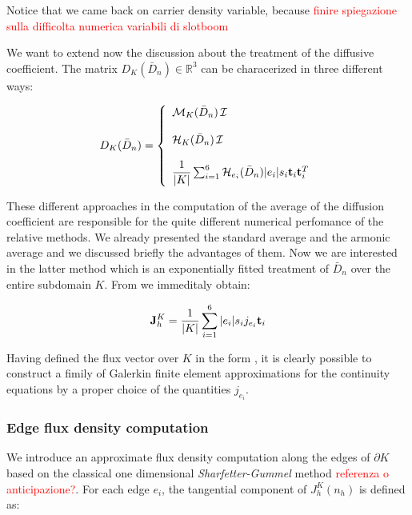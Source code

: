 Notice that we came back on carrier density variable, because 
\textcolor{red}{finire spiegazione sulla difficolta numerica variabili di slotboom}

We want to extend now the discussion about the treatment of the diffusive coefficient. The matrix $D_K(\bar{D}_n) \in \mathbb{R}^3$ can be characerized in three different ways:

\begin{equation}
D_K(\bar{D}_n) = \left\{ 
\begin{array}{l}
\mathcal{M}_K(\bar{D}_n) \, \mathcal{I}
\\
\\
\mathcal{H}_K(\bar{D}_n) \, \mathcal{I}
\\
\\
 \dfrac{1}{|K|}\sum_{i=1}^6 \mathcal{H}_{e_i}(\bar{D}_n) |e_i| s_i \mathbf{t}_i \mathbf{t}_i^T
\end{array}
\right.
\end{equation} 

These different approaches in the computation of the average of the diffusion coefficient are responsible for the quite different numerical perfomance of the relative methods.
We already presented the standard average and the armonic average and we discussed briefly the advantages of them. 
Now we are interested in the latter method which  is an exponentially fitted treatment of $\bar{D}_n$ over the entire subdomain $K$. 
From  we immeditaly obtain:

\begin{equation}
\label{eq: exp fitted flux}
\mathbf{J}_h^K = \dfrac{1}{|K|}\sum_{i=1}^6 |e_i| s_i j_{e_i} \mathbf{t}_i 
\end{equation}

Having defined the flux vector over $K$ in the form , it is clearly possible to construct a fimily of Galerkin finite element approximations for the continuity equations by a proper choice of the quantities $j_{e_i}$. 

\subsubsection{Edge flux density computation}

We introduce an approximate flux density computation along the edges of $\partial K$ based on the classical one dimensional \textit{Sharfetter-Gummel} method \textcolor{red}{referenza o anticipazione?}. For each edge $e_i$, the tangential component of $J_h^K(n_h)$ is defined as:

